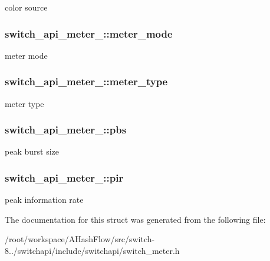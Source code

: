 color source \hypertarget{structswitch__api__meter___a605f435903aa93df506e45ca7acae9fb}{
\subsubsection[{meter\+\_\+mode}]{ switch\+\_\+api\+\_\+meter\+\_\+\+::meter\+\_\+mode}}\label{structswitch__api__meter___a605f435903aa93df506e45ca7acae9fb}
meter mode \hypertarget{structswitch__api__meter___a7e99349d0f073fdc4a1ad2777f5e53bd}{
\subsubsection[{meter\+\_\+type}]{ switch\+\_\+api\+\_\+meter\+\_\+\+::meter\+\_\+type}}\label{structswitch__api__meter___a7e99349d0f073fdc4a1ad2777f5e53bd}
meter type \hypertarget{structswitch__api__meter___a2af25c415c5ddcb07f862b713c32fcf6}{
\subsubsection[{pbs}]{ switch\+\_\+api\+\_\+meter\+\_\+\+::pbs}}\label{structswitch__api__meter___a2af25c415c5ddcb07f862b713c32fcf6}
peak burst size \hypertarget{structswitch__api__meter___a4f9e0af4278f74d3889e5b41cb8cdf97}{
\subsubsection[{pir}]{ switch\+\_\+api\+\_\+meter\+\_\+\+::pir}}\label{structswitch__api__meter___a4f9e0af4278f74d3889e5b41cb8cdf97}
peak information rate 

The documentation for this struct was generated from the following file\+:\begin{DoxyCompactItemize}
\item 
/root/workspace/\+A\+Hash\+Flow/src/switch-\/8../switchapi/include/switchapi/switch\+\_\+meter.\+h\end{DoxyCompactItemize}
